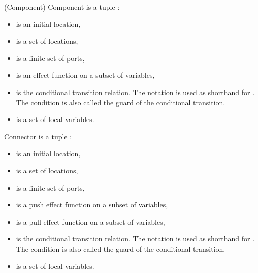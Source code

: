 \begin{mydef} \label{def:pa:comp} \normalfont (Component) Component is a tuple :
\begin{itemize}
	\item {} is an initial location,
	\item {} is a set of locations,
	\item {}  is a finite set of ports,
	\item {}  is an effect function on a subset of variables, 
	\item {} is the conditional transition relation. The notation   is used as shorthand for . The condition  is also called the guard of the conditional transition.
	
	
	\item {} is a set of local variables.
\end{itemize}
\end{mydef}

\begin{mydef} \label{def:pa:connector}  \normalfont Connector is a tuple :
\begin{itemize}
	\item {} is an initial location,
	\item {} is a set of locations,
	\item {}  is a finite set of ports,
    \item {}  is a push effect function on a subset of variables, 
    \item {}  is a pull effect function on a subset of variables,
	\item {} is the conditional transition relation. The notation   is used as shorthand for . The condition  is also called the guard of the conditional transition.
	
	\item {} is a set of local variables.
\end{itemize}
\end{mydef}



